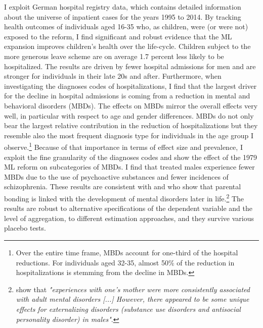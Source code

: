 \documentclass[11pt, a4paper, draft]{article} %
\begin{document}
I exploit German hospital registry data, which contains detailed information about the universe of inpatient cases for the years 1995 to 2014. By tracking health outcomes of individuals aged 16-35 who, as children, were (or were not) exposed to the reform, I find significant and robust evidence that the ML expansion improves children's health over the life-cycle. Children subject to the more generous leave scheme are on average 1.7 percent less likely to be hospitalized. The results are driven by fewer hospital admissions for men and are stronger for individuals in their late 20s and after. Furthermore, when investigating the diagnoses codes of hospitalizations, I find that the largest driver for the decline in hospital admissions is coming from a reduction in mental and behavioral disorders (MBDs). The effects on MBDs mirror the overall effects very well, in particular with respect to age and gender differences. MBDs do not only bear the largest relative contribution in the reduction of hospitalizations but they resemble also the most frequent diagnosis type for individuals in the age group I observe.\footnote{Over the entire time frame, MBDs account for one-third of the hospital reductions. For individuals aged 32-35, almost 50\% of the reduction in hospitalizations is stemming from the decline in MBDs.} Because of that importance in terms of effect size and prevalence, I exploit the fine granularity of the diagnoses codes and show the effect of the 1979 ML reform on subcategories of MBDs. I find that treated males experience fewer MBDs due to the use of psychoactive substances and fewer incidences of schizophrenia. These results are consistent with \cite{canetti1997parental} and \cite{enns_cox_clara_2002} who show that parental bonding is linked with the development of mental disorders later in life.\footnote{\cite{enns_cox_clara_2002} show that \textit{"experiences with one's mother were more consistently associated with adult mental disorders [...] However, there appeared to be some unique effects for externalizing disorders (substance use disorders and antisocial personality disorder) in males"}.} The results are robust to alternative specifications of the dependent variable and the level of aggregation, to different estimation approaches, and they survive various placebo tests. %
\end{document}
